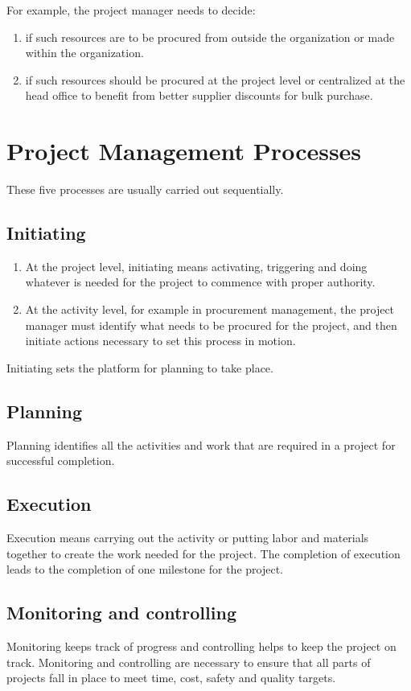 \documentclass[math,code]{amznotes}
\theoremstyle{remark}
\begin{document}
For example, the project manager needs to decide:
\begin{enumerate}
    \item if such resources are to be procured from outside the organization or made within the organization.
    \item if such resources should be procured at the project level or centralized at the head office to benefit from better supplier discounts for bulk purchase.
\end{enumerate}

\section{Project Management Processes}
These five processes are usually carried out sequentially.

\subsection{Initiating}
\begin{enumerate}
    \item At the project level, initiating means activating, triggering and doing whatever is needed for the project to commence with proper authority.
    \item At the activity level, for example in procurement management, the project manager must identify what needs to be procured for the project, and then initiate actions necessary to set this process in motion.
\end{enumerate}
Initiating sets the platform for planning to take place.

\subsection{Planning}
Planning identifies all the activities and work that are required in a project for successful completion.

\subsection{Execution}
Execution means carrying out the activity or putting labor and materials together to create the work needed for the project. The completion of execution leads to the completion of one milestone for the project.

\subsection{Monitoring and controlling}
Monitoring keeps track of progress and controlling helps to keep the project on track. Monitoring and controlling are necessary to ensure that all parts of projects fall in place to meet time, cost, safety and quality targets.
\end{document}
